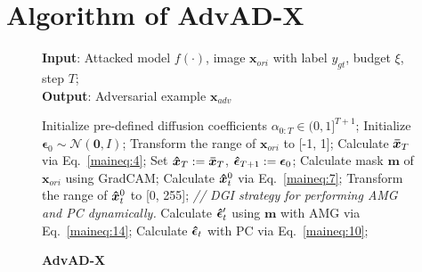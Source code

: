 \documentclass{article}
\begin{document}
\section{Algorithm of AdvAD-X} \label{app:Algo}
\begin{figure}[h]
\centering
\vspace{-0.5cm}
\begin{minipage}{0.9\linewidth}
\begin{algorithm}[H]
    \footnotesize
    \caption{\textbf{AdvAD-X}}
    \label{alg:algorithm}
    \textbf{Input}: Attacked model $f(\cdot)$, image $\boldsymbol{x}_{ori}$ with label $y_{gt}$, budget $\xi$, step $T$;\\
    \textbf{Output}: Adversarial example $\boldsymbol{x}_{adv}$
    \begin{algorithmic}[1] %
        \STATE Initialize pre-defined diffusion coefficients $\alpha_{0:T}\in(0,1]^{T+1}$;
        \STATE Initialize $\boldsymbol{\epsilon}_{0} \sim \mathcal{N}(\boldsymbol{0}, \boldsymbol{\mathit{I}})$; 
        \STATE Transform the range of $\boldsymbol{x}_{ori}$ to [-1, 1]; 
        \STATE Calculate $\boldsymbol{\Bar{x}}_{T}$ via Eq.~\eqref{maineq:4}; 
        \STATE Set $\boldsymbol{\Hat{x}}_{T}:=\boldsymbol{\Bar{x}}_{T}$, $\boldsymbol{\Hat{\epsilon}}_{T+1}:=\boldsymbol{\epsilon}_{0}$; 
        \STATE Calculate mask $\boldsymbol{m}$ of $\boldsymbol{x}_{ori}$ using GradCAM; 
            \STATE Calculate $\boldsymbol{\Hat{x}}_{t}^{0}$ via Eq.~\eqref{maineq:7}; 
            \STATE Transform the range of $\boldsymbol{\Hat{x}}_t^0$ to [0, 255]; 
            \STATE \textit{// DGI strategy for performing AMG and PC dynamically.}
                \STATE Calculate $\boldsymbol{\Hat{\epsilon}}_{t}'$ using  $\boldsymbol{m}$ with AMG via Eq.~\eqref{maineq:14}; 
                \STATE Calculate $\boldsymbol{\Hat{\epsilon}}_{t}$ with PC  via Eq.~\eqref{maineq:10}; 

\end{algorithmic}
\end{algorithm}
\end{minipage}
\end{figure}
\end{document}
